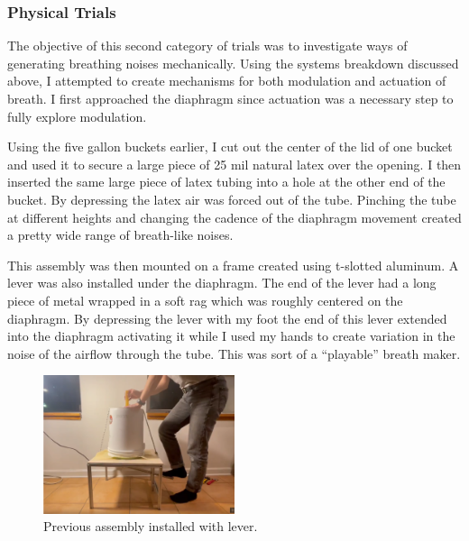 \documentclass[letterpaper]{article}
\begin{document}
\subsubsection{Physical Trials}

The objective of this second category of trials was to investigate ways of generating breathing noises mechanically. Using the systems breakdown discussed above, I attempted to create mechanisms for both modulation and actuation of breath. I first approached the diaphragm since actuation was a necessary step to fully explore modulation.

Using the five gallon buckets earlier, I cut out the center of the lid of one bucket and used it to secure a large piece of 25 mil natural latex over the opening. I then inserted the same large piece of latex tubing into a hole at the other end of the bucket. By depressing the latex air was forced out of the tube. Pinching the tube at different heights and changing the cadence of the diaphragm movement created a pretty wide range of breath-like noises. 


This assembly was then mounted on a frame created using t-slotted aluminum. A lever was also installed under the diaphragm. The end of the lever had a long piece of metal wrapped in a soft rag which was roughly centered on the diaphragm. By depressing the lever with my foot the end of this lever extended into the diaphragm activating it while I used my hands to create variation in the noise of the airflow through the tube. This was sort of a ``playable'' breath maker. 

\begin{figure}[h]
\includegraphics[width=0.5\textwidth]{images/playablebreath1.png}
\caption{Previous assembly installed with lever.}
\end{figure}
\end{document}
